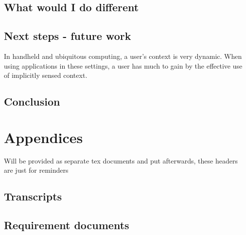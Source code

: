 \documentclass[]{report}
\begin{document}
\section{What would I do different}

\section{Next steps - future work}

In handheld and ubiquitous computing, a user's context is very dynamic. When
using applications in these settings, a user has much to gain by the effective
use of implicitly sensed context\cite{dey99:towar}.

\section{Conclusion}

{}



\chapter{Appendices}

Will be provided as separate tex documents and put afterwards, these headers are
just for reminders

\section{Transcripts}

\section{Requirement documents}
\end{document}
